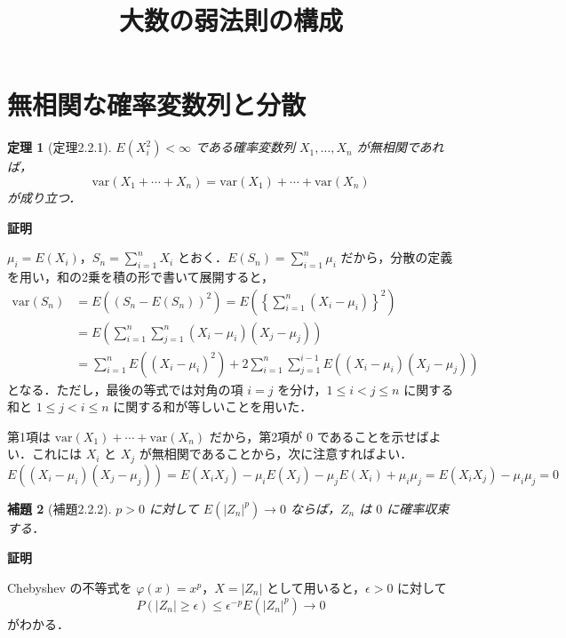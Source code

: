 \documentclass[dvipdfmx]{jsarticle}
\title{\bf 大数の弱法則の構成}
\author{}
\date{}
\makeatletter
\numberwithin{equation}{section}
\theoremstyle{plain}
\newtheorem{thm}{定理}[section]
\newtheorem{lem}[thm]{補題}
\renewenvironment{proof}[1][\proofname]{\par
  \pushQED{\qed}%
  \normalfont \topsep6\p@\@plus6\p@\relax
  \trivlist
  \item\relax
  {\bfseries
  #1\@addpunct{.}}\hspace\labelsep\ignorespaces
}{%
  \popQED\endtrivlist\@endpefalse
}
\renewcommand{\proofname}{証明}
\makeatother
\begin{document}
\maketitle

\section{無相関な確率変数列と分散}

\begin{thm}[定理2.2.1]
$E(X_i^2) < \infty$ である確率変数列 $X_1,\dots,X_n$ が無相関であれば，
\[
  \mathrm{var}(X_1 + \cdots + X_n) = \mathrm{var}(X_1) + \cdots + \mathrm{var}(X_n)
\]
が成り立つ．
\end{thm}

\begin{proof}
$\mu_i = E(X_i)$，$S_n = \sum_{i=1}^n X_i$ とおく．$E(S_n) = \sum_{i=1}^n \mu_i$ だから，分散の定義を用い，和の2乗を積の形で書いて展開すると，
\begin{align*}
  \mathrm{var}(S_n)
  &= E\!\left((S_n - E(S_n))^2\right)
   = E\!\left(\left\{\sum_{i=1}^n (X_i - \mu_i)\right\}^2\right) \\
  &= E\!\left(\sum_{i=1}^n \sum_{j=1}^n (X_i - \mu_i)(X_j - \mu_j)\right) \\
  &= \sum_{i=1}^n E\!\left((X_i - \mu_i)^2\right) + 2\sum_{i=1}^n \sum_{j=1}^{i-1} E\!\left((X_i - \mu_i)(X_j - \mu_j)\right)
\end{align*}
となる．ただし，最後の等式では対角の項 $i=j$ を分け，$1 \le i < j \le n$ に関する和と $1 \le j < i \le n$ に関する和が等しいことを用いた．

第1項は $\mathrm{var}(X_1) + \cdots + \mathrm{var}(X_n)$ だから，第2項が $0$ であることを示せばよい．これには $X_i$ と $X_j$ が無相関であることから，次に注意すればよい．
\[
  E\!\left((X_i - \mu_i)(X_j - \mu_j)\right)
  = E(X_iX_j) - \mu_i E(X_j) - \mu_j E(X_i) + \mu_i\mu_j
  = E(X_iX_j) - \mu_i\mu_j = 0
\]
\end{proof}

\begin{lem}[補題2.2.2]
$p > 0$ に対して $E(|Z_n|^p) \to 0$ ならば，$Z_n$ は $0$ に確率収束する．
\end{lem}

\begin{proof}
Chebyshev の不等式を $\varphi(x) = x^p$，$X = |Z_n|$ として用いると，$\epsilon > 0$ に対して
\[
  P(|Z_n| \ge \epsilon) \le \epsilon^{-p} E(|Z_n|^p) \to 0
\]
がわかる．
\end{proof}
\end{document}
